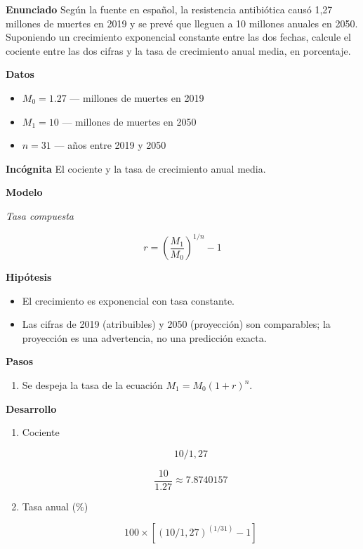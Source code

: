 \documentclass{book}
\begin{document}
\begin{tcolorbox}[title={Problema resuelto}, studiumworked, breakable]

\noindent\textbf{Enunciado}
Según la fuente en español, la resistencia antibiótica causó 1,27 millones de muertes en 2019 y se prevé que lleguen a 10 millones anuales en 2050. Suponiendo un crecimiento exponencial constante entre las dos fechas, calcule el cociente entre las dos cifras y la tasa de crecimiento anual media, en porcentaje.


\noindent\textbf{Datos}
\begin{itemize}
\item $M_{0} = 1.27$ — millones de muertes en 2019
\item $M_{1} = 10$ — millones de muertes en 2050
\item $n = 31$ — años entre 2019 y 2050
\end{itemize}

\noindent\textbf{Incógnita}
El cociente y la tasa de crecimiento anual media.


\noindent\textbf{Modelo}

\noindent\textit{Tasa compuesta}

\[
r = \left(\frac{M_1}{M_0}\right)^{1/n} - 1
\]

\noindent\textbf{Hipótesis}
\begin{itemize}
\item El crecimiento es exponencial con tasa constante.
\item Las cifras de 2019 (atribuibles) y 2050 (proyección) son comparables; la proyección es una advertencia, no una predicción exacta.
\end{itemize}

\noindent\textbf{Pasos}
\begin{enumerate}
\item
Se despeja la tasa de la ecuación \(M_1 = M_0 (1 + r)^n\).

\end{enumerate}

\noindent\textbf{Desarrollo}
\begin{enumerate}
\item
Cociente


\[
10/1,27
\]

\[
\frac{10}{1.27} \approx 7.8740157
\]
\item
Tasa anual (\%)


\[
100 \times [(10/1,27)^(1/31) - 1]
\]


\end{enumerate}
\end{tcolorbox}
\end{document}
